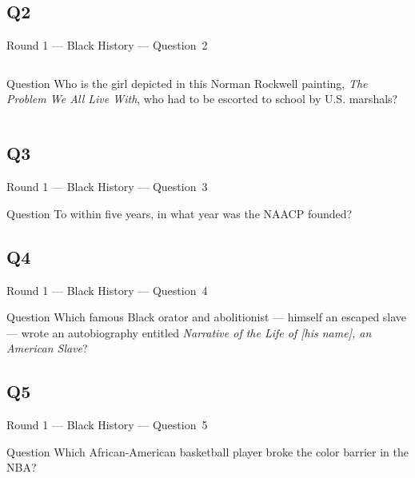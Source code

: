 \documentclass[11pt]{beamer}
\begin{document}
\subsection*{Q2}
\begin{frame}[t]{Round 1 --- Black History --- \mbox{Question 2}}
\vspace{-0.5em}
\begin{columns}[T,totalwidth=\linewidth]
\begin{column}{0.32\linewidth}
\begin{block}{Question}
Who is the girl depicted in this Norman Rockwell painting, \emph{The Problem We All Live With}, who had to be escorted to school by U.S. marshals?
\end{block}
\end{column}
\begin{column}{0.65\linewidth}
\begin{center}
\texttt{[image: \{Images/rubybridges]}.jpg}
\end{center}
\end{column}
\end{columns}
\end{frame}
\subsection*{Q3}
\begin{frame}[t]{Round 1 --- Black History --- \mbox{Question 3}}
\vspace{-0.5em}
\begin{block}{Question}
To within five years, in what year was the NAACP founded?
\end{block}
\end{frame}
\subsection*{Q4}
\begin{frame}[t]{Round 1 --- Black History --- \mbox{Question 4}}
\vspace{-0.5em}
\begin{block}{Question}
Which famous Black orator and abolitionist --- himself an escaped slave --- wrote an autobiography entitled \emph{Narrative of the Life of [his name], an American Slave}?
\end{block}
\end{frame}
\subsection*{Q5}
\begin{frame}[t]{Round 1 --- Black History --- \mbox{Question 5}}
\vspace{-0.5em}
\begin{block}{Question}
Which African-American basketball player broke the color barrier in the NBA\@?
\end{block}
\end{frame}
\end{document}
